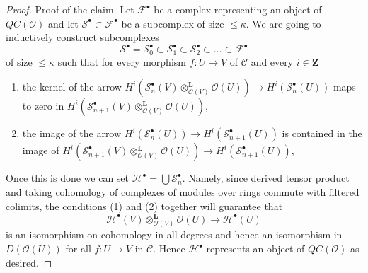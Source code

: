 \documentclass[10pt,a4paper]{amsart}
\theoremstyle{plain}
\theoremstyle{definition}
\theoremstyle{remark}
\numberwithin{equation}{subsection}
\begin{document}
\begin{proof}
\medskip\noindent
Proof of the claim. Let $\mathcal{F}^\bullet$ be a complex representing
an object of $\mathit{QC}(\mathcal{O})$ and let
$\mathcal{S}^\bullet \subset \mathcal{F}^\bullet$ be a subcomplex of
size $\leq \kappa$. We are going to inductively construct subcomplexes
$$
\mathcal{S}^\bullet = \mathcal{S}_0^\bullet \subset
\mathcal{S}_1^\bullet \subset
\mathcal{S}_2^\bullet \subset \ldots \subset \mathcal{F}^\bullet
$$
of size $\leq \kappa$ such that for every morphism $f : U \to V$
of $\mathcal{C}$ and every $i \in \mathbf{Z}$
\begin{enumerate}
\item the kernel of the arrow
$H^i(\mathcal{S}_n^\bullet(V)
\otimes_{\mathcal{O}(V)}^\mathbf{L} \mathcal{O}(U)) \to
H^i(\mathcal{S}_n^\bullet(U))$
maps to zero in
$H^i(\mathcal{S}_{n + 1}^\bullet(V)
\otimes_{\mathcal{O}(V)}^\mathbf{L} \mathcal{O}(U))$,
\item the image of the arrow
$H^i(\mathcal{S}_n^\bullet(U)) \to H^i(\mathcal{S}_{n + 1}^\bullet(U))$
is contained in the image of
$H^i(\mathcal{S}_{n + 1}^\bullet(V)
\otimes_{\mathcal{O}(V)}^\mathbf{L} \mathcal{O}(U)) \to
H^i(\mathcal{S}_{n + 1}^\bullet(U))$,
\end{enumerate}
Once this is done we can set
$\mathcal{H}^\bullet = \bigcup \mathcal{S}_n^\bullet$.
Namely, since derived tensor product and taking cohomology of
complexes of modules over rings commute with filtered
colimits, the conditions (1) and (2) together will guarantee
that
$$
\mathcal{H}^\bullet(V) \otimes_{\mathcal{O}(V)}^\mathbf{L} \mathcal{O}(U)
\longrightarrow
\mathcal{H}^\bullet(U)
$$
is an isomorphism on cohomology in all degrees and hence an isomorphism
in $D(\mathcal{O}(U))$ for all $f : U \to V$ in $\mathcal{C}$.
Hence $\mathcal{H}^\bullet$ represents an object of
$\mathit{QC}(\mathcal{O})$ as desired.


\end{proof}
\end{document}
